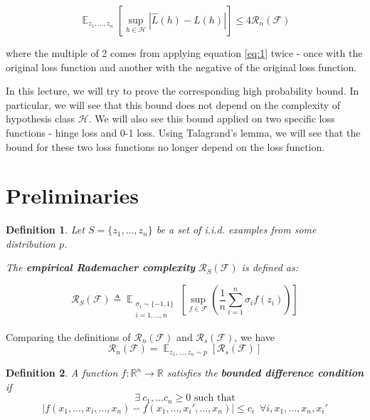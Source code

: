 \documentclass[11pt]{article}
\DeclareMathOperator*{\E}{\mathbb{E}}
\newtheorem{defn}{Definition}
\begin{document}
\begin{equation}
\E_{z_1,...,z_n} \left[ \sup_{h\in \mathcal{H}} \left| \hat{L}(h) - L(h) \right| \right] \leq 4\mathcal{R}_n(\mathcal{F}) 
\end{equation}

where the multiple of 2 comes from applying equation \eqref{eq:1} twice - once with the original loss function and another with the negative of the original loss function.

In this lecture, we will try to prove the corresponding high probability bound. In particular, we will see that this bound does not depend on the complexity of hypothesis class $\mathcal{H}$. We will also see this bound applied on two specific loss functions - hinge loss and 0-1 loss. Using Talagrand's lemma, we will see that the bound for these two loss functions no longer depend on the loss function.

\section{Preliminaries}
\begin{defn}
Let $S=\{z_1,...,z_n\}$ be a set of i.i.d. examples from some distribution $p$.

The \textbf{empirical Rademacher complexity} $\mathcal{R}_S(\mathcal{F})$ is defined as:

\begin{equation}
\mathcal{R}_S(\mathcal{F}) \triangleq \E_{\substack{\sigma_i \sim \{-1,1\}\\i=1,...,n}} \left[ \sup_{f \in \mathcal{F}} \left( \frac{1}{n} \sum_{i=1}^n \sigma_i f(z_i) \right) \right]
\end{equation}
\end{defn}

Comparing the definitions of $\mathcal{R}_n(\mathcal{F})$ and $\mathcal{R}_s(\mathcal{F})$, we have
\begin{equation}
\mathcal{R}_n(\mathcal{F}) = \E_{z_1,...,z_n \sim p}\left[\mathcal{R}_s(\mathcal{F})\right]
\end{equation}

\begin{defn}
A function $f:\mathbb{R}^n \to \mathbb{R}$ satisfies
the \textbf{bounded difference condition} if
$$\exists~c_1,...c_n \geq 0 \text{  such that} $$
$$\left| f(x_1,...,x_i,...,x_n) - f(x_1,...,x_i',...,x_n) \right| \leq c_i \,\,\, \forall i, x_1,...,x_n, x_i'$$
\end{defn}
\end{document}
